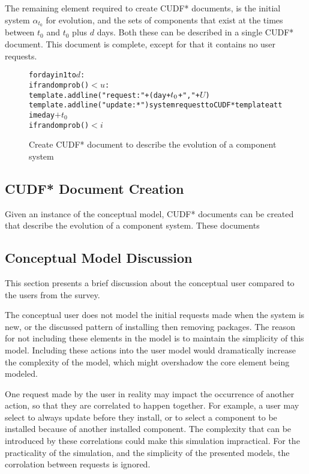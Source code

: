 The remaining element required to create CUDF* documents, is the initial system $\alpha_{t_0}$ for evolution, 
and the sets of components that exist at the times between $t_0$ and $t_0$ plus $d$ days.
Both these can be described in a single CUDF* document.
This document is complete, except for that it contains no user requests.

\begin{figure}[h]
\begin{center}
\begin{alltt}
for day in 1 to \(d\):
   if randomprob() \(< u\):
       template.addline("request: " + (day + \(t\sb{0}\) + ", " + \(U\))
       template.addline("update: *")  system request to CUDF* template at time day \(+ t_0\)
   if randomprob() \(< i\)   

\end{alltt}
  \caption{Create CUDF* document to describe the evolution of a component system}
  \label{sim.CUDF*}
\end{center}
\end{figure}


\subsection{CUDF* Document Creation}
Given an instance of the conceptual model, CUDF* documents can be created that describe the evolution of a component system.
These documents 


\subsection{Conceptual Model Discussion}
This section presents a brief discussion about the conceptual user compared to the users from the survey.

The conceptual user does not model the initial requests made when the system is new, 
or the discussed pattern of installing then removing packages.
The reason for not including these elements in the model is to maintain the simplicity of this model.
Including these actions into the user model would dramatically increase the complexity of the model, 
which might overshadow the core element being modeled. 

One request made by the user in reality may impact the occurrence of another action, so that they are correlated to happen together.
For example, a user may select to always update before they install, or to select a component to be installed because of another installed component.
The complexity that can be introduced by these correlations could make this simulation impractical.
For the practicality of the simulation, and the simplicity of the presented models, the corrolation between requests is ignored.

